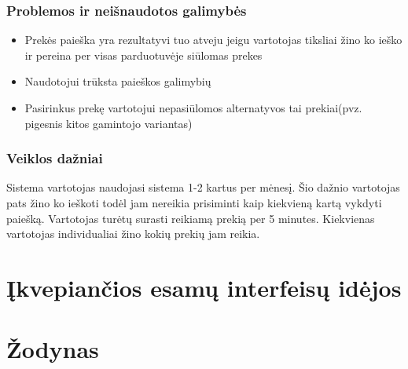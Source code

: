 \documentclass[oneside]{VUMIFPSkursinis}
\begin{document}
	\subsubsection{Problemos ir neišnaudotos galimybės}
		\begin{itemize}
			\item{Prekės paieška yra rezultatyvi tuo atveju jeigu vartotojas tiksliai žino ko ieško ir pereina per visas parduotuvėje siūlomas prekes}
			\item{Naudotojui trūksta paieškos galimybių}
			\item{Pasirinkus prekę vartotojui nepasiūlomos alternatyvos tai prekiai(pvz. pigesnis kitos gamintojo variantas)}
		\end{itemize}
	\subsubsection{Veiklos dažniai}
		Sistema vartotojas naudojasi sistema 1-2 kartus per mėnesį.
		Šio dažnio vartotojas pats žino ko ieškoti todėl jam nereikia prisiminti kaip kiekvieną kartą vykdyti paiešką.
		Vartotojas turėtų surasti reikiamą prekią per 5 minutes.
		Kiekvienas vartotojas individualiai žino kokių prekių jam reikia.

\section{Įkvepiančios esamų interfeisų idėjos}

\section{Žodynas}
\end{document}

